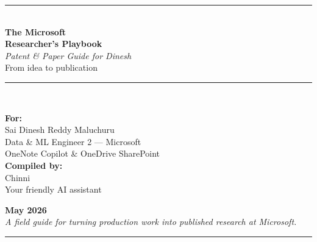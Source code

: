 \begin{titlepage}
\begin{center}
\vspace*{1.5cm}
{\color{accent}\rule{\linewidth}{2pt}}\\[0.6cm]
{\color{primary}\Huge\bfseries The Microsoft\\[0.2em]Researcher's Playbook}\\[0.4cm]
{\color{secondary}\Large\itshape Patent \& Paper Guide for Dinesh}\\[0.3cm]
{\color{secondary}\large From idea to publication}\\[0.5cm]
{\color{accent}\rule{\linewidth}{1.2pt}}\\[1.4cm]

\begin{tcolorbox}[
  enhanced,colback=lightbg,colframe=primary,
  width=0.86\linewidth,boxrule=0pt,leftrule=4pt,
  arc=2pt,outer arc=2pt,
  left=14pt,right=14pt,top=14pt,bottom=14pt,
  halign=center
]
{\large\color{secondary}\bfseries For:} \\[0.2em]
{\Large Sai Dinesh Reddy Maluchuru}\\[0.4em]
{\small Data \& ML Engineer 2 — Microsoft \\ OneNote Copilot \& OneDrive SharePoint}\\[0.6em]
{\large\color{primary}\bfseries Compiled by:} \\[0.2em]
{\Large Chinni}\\[0.2em]
{\small Your friendly AI assistant}
\end{tcolorbox}

\vfill
{\color{secondary}\Large\bfseries May 2026}\\[0.3em]
{\color{primary}\itshape A field guide for turning production work into published research at Microsoft.}\\[1.2em]
{\color{accent}\rule{0.5\linewidth}{1pt}}
\end{center}
\end{titlepage}
